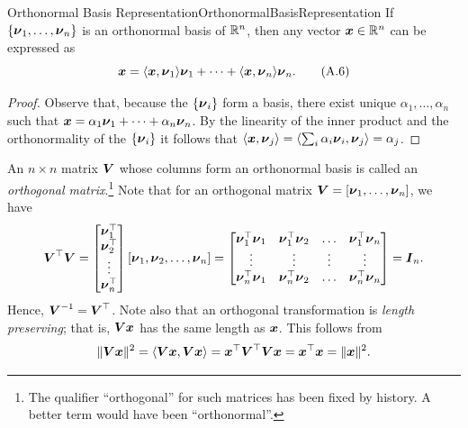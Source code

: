 \begin{thm}{Orthonormal Basis Representation}{OrthonormalBasisRepresentation}
	If \(\{\boldsymbol{\nu}_1, \dots, \boldsymbol{\nu}_n\}\) is an orthonormal basis of \(\mathbb{R}^n\), then any vector \(\boldsymbol{x} \in \mathbb{R}^n\) can be expressed as
	\begin{equation}
		\boldsymbol{x} = \langle \boldsymbol{x}, \boldsymbol{\nu}_1 \rangle \boldsymbol{\nu}_1 + \dots + \langle \boldsymbol{x}, \boldsymbol{\nu}_n \rangle \boldsymbol{\nu}_n. \tag{A.6}
	\end{equation}
\end{thm}
\begin{proof}
	Observe that, because the \(\{\boldsymbol{\nu}_i\}\) form a basis, there exist unique \(\alpha_1, \dots, \alpha_n\) such that \(\boldsymbol{x} = \alpha_1 \boldsymbol{\nu}_1 + \dots + \alpha_n \boldsymbol{\nu}_n\). By the linearity of the inner product and the orthonormality of the \(\{\boldsymbol{\nu}_i\}\) it follows that \(\langle \boldsymbol{x}, \boldsymbol{\nu}_j \rangle = \langle \sum_i \alpha_i \boldsymbol{\nu}_i, \boldsymbol{\nu}_j \rangle = \alpha_j\).
\end{proof}
An \(n \times n\) matrix \(\boldsymbol{V}\) whose columns form an orthonormal basis is called an \textit{orthogonal matrix}.\footnote{The qualifier ``orthogonal'' for such matrices has been fixed by history. A better term would have been ``orthonormal''.} Note that for an orthogonal matrix \(\boldsymbol{V} = [\boldsymbol{\nu}_1, \dots, \boldsymbol{\nu}_n]\), we have
\begin{equation*}
	\boldsymbol{V}^\top \boldsymbol{V} =
	\begin{bmatrix}
		\boldsymbol{\nu}_1^\top \\
		\boldsymbol{\nu}_2^\top \\
		\vdots          \\
		\boldsymbol{\nu}_n^\top
	\end{bmatrix}
	[\boldsymbol{\nu}_1, \boldsymbol{\nu}_2, \dots, \boldsymbol{\nu}_n] =
	\begin{bmatrix}
		\boldsymbol{\nu}_1^\top \boldsymbol{\nu}_1 & \boldsymbol{\nu}_1^\top \boldsymbol{\nu}_2 & \dots  & \boldsymbol{\nu}_1^\top \boldsymbol{\nu}_n \\
		\vdots                       & \vdots                       & \vdots & \vdots                       \\
		\boldsymbol{\nu}_n^\top \boldsymbol{\nu}_1 & \boldsymbol{\nu}_n^\top \boldsymbol{\nu}_2 & \dots  & \boldsymbol{\nu}_n^\top \boldsymbol{\nu}_n
	\end{bmatrix}
	= \boldsymbol{I}_n.
\end{equation*}
Hence, \(\boldsymbol{V}^{-1} = \boldsymbol{V}^\top\). Note also that an orthogonal transformation is \textit{length preserving}; that is, \(\boldsymbol{Vx}\) has the same length as \(\boldsymbol{x}\). This follows from
\begin{equation*}
	\|\boldsymbol{Vx}\|^2 = \langle \boldsymbol{Vx}, \boldsymbol{Vx} \rangle = \boldsymbol{x}^\top \boldsymbol{V}^\top \boldsymbol{V} \boldsymbol{x} = \boldsymbol{x}^\top \boldsymbol{x} = \|\boldsymbol{x}\|^2.
\end{equation*}
